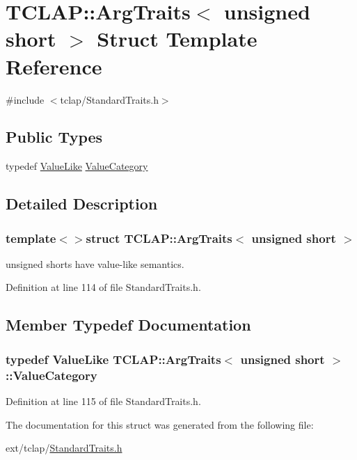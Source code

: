 \hypertarget{struct_t_c_l_a_p_1_1_arg_traits_3_01unsigned_01short_01_4}{}\section{T\+C\+L\+A\+P\+:\+:Arg\+Traits$<$ unsigned short $>$ Struct Template Reference}
\label{struct_t_c_l_a_p_1_1_arg_traits_3_01unsigned_01short_01_4}


{\ttfamily \#include $<$tclap/\+Standard\+Traits.\+h$>$}

\subsection*{Public Types}
\begin{DoxyCompactItemize}
\item 
typedef \hyperlink{struct_t_c_l_a_p_1_1_value_like}{Value\+Like} \hyperlink{struct_t_c_l_a_p_1_1_arg_traits_3_01unsigned_01short_01_4_a0efa2ce53e9cb98dc4a58dda24127d3a}{Value\+Category}
\end{DoxyCompactItemize}


\subsection{Detailed Description}
\subsubsection*{template$<$$>$struct T\+C\+L\+A\+P\+::\+Arg\+Traits$<$ unsigned short $>$}

unsigned shorts have value-\/like semantics. 

Definition at line 114 of file Standard\+Traits.\+h.



\subsection{Member Typedef Documentation}
\hypertarget{struct_t_c_l_a_p_1_1_arg_traits_3_01unsigned_01short_01_4_a0efa2ce53e9cb98dc4a58dda24127d3a}{}
\subsubsection[{Value\+Category}]{\setlength{\rightskip}{0pt plus 5cm}typedef {\bf Value\+Like} {\bf T\+C\+L\+A\+P\+::\+Arg\+Traits}$<$ unsigned short $>$\+::{\bf Value\+Category}}\label{struct_t_c_l_a_p_1_1_arg_traits_3_01unsigned_01short_01_4_a0efa2ce53e9cb98dc4a58dda24127d3a}


Definition at line 115 of file Standard\+Traits.\+h.



The documentation for this struct was generated from the following file\+:\begin{DoxyCompactItemize}
\item 
ext/tclap/\hyperlink{_standard_traits_8h}{Standard\+Traits.\+h}\end{DoxyCompactItemize}
